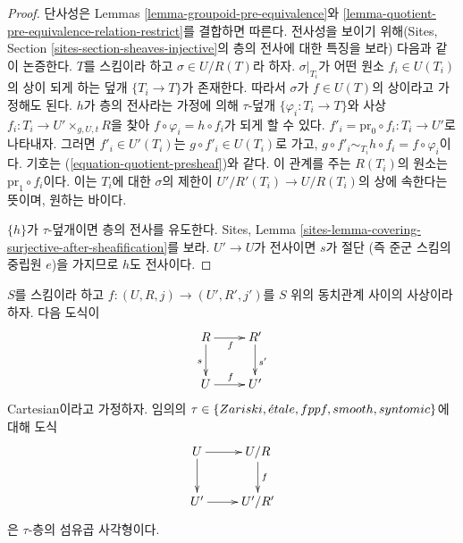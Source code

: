 \begin{proof}
단사성은 Lemmas \ref{lemma-groupoid-pre-equivalence}와
\ref{lemma-quotient-pre-equivalence-relation-restrict}를 결합하면 따른다. 전사성을 보이기 위해(Sites, Section
\ref{sites-section-sheaves-injective}의 층의 전사에 대한 특징을 보라) 다음과 같이 논증한다. $T$를 스킴이라 하고
$\sigma \in U/R(T)$라 하자. $\sigma|_{T_i}$가 어떤 원소 $f_i \in U(T_i)$의 상이 되게 하는 덮개
$\{T_i \to T\}$가 존재한다. 따라서 $\sigma$가 $f \in U(T)$의 상이라고 가정해도 된다. $h$가 층의 전사라는 가정에 의해
$\tau$-덮개 $\{\varphi_i : T_i \to T\}$와 사상 $f_i : T_i \to U' \times_{g, U, t} R$을 찾아
$f \circ \varphi_i = h \circ f_i$가 되게 할 수 있다. $f'_i = \text{pr}_0 \circ f_i : T_i \to U'$로 나타내자.
그러면 $f'_i \in U'(T_i)$는 $g \circ f'_i \in U(T_i)$로 가고,
$g \circ f'_i \sim_{T_i} h \circ f_i = f \circ \varphi_i$이다. 기호는
(\ref{equation-quotient-presheaf})와 같다. 이 관계를 주는 $R(T_i)$의 원소는 $\text{pr}_1 \circ f_i$이다.
이는 $T_i$에 대한 $\sigma$의 제한이 $U'/R'(T_i) \to U/R(T_i)$의 상에 속한다는 뜻이며, 원하는 바이다.

\medskip\noindent
$\{h\}$가 $\tau$-덮개이면 층의 전사를 유도한다. Sites, Lemma
\ref{sites-lemma-covering-surjective-after-sheafification}를 보라. $U' \to U$가 전사이면 $s$가 절단
(즉 준군 스킴의 중립원 $e$)을 가지므로 $h$도 전사이다.
\end{proof}

\begin{lemma}
\label{lemma-criterion-fibre-product}
$S$를 스킴이라 하고 $f : (U, R, j) \to (U', R', j')$를 $S$ 위의 동치관계 사이의 사상이라 하자. 다음 도식이
$$
\xymatrix{
R \ar[d]_s \ar[r]_f & R' \ar[d]^{s'} \\
U \ar[r]^f & U'
}
$$
Cartesian이라고 가정하자. 임의의 $\tau \in  \{Zariski, {\acute{e}tale}, fppf, smooth, syntomic\}$에 대해 도식
$$
\xymatrix{
U \ar[d] \ar[r] & U/R \ar[d]^f \\
U' \ar[r] & U'/R'
}
$$
은 $\tau$-층의 섬유곱 사각형이다.
\end{lemma}

